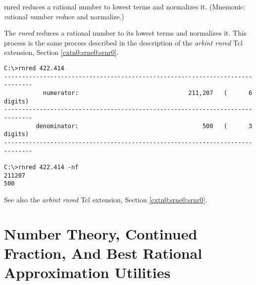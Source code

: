 \begin{dosutilcommandname}{rnred}%
reduces a rational number to lowest terms and normalizes it.
(Mnemonic:  \emph{r}ational
\emph{n}umber \emph{red}uce and normalize.)
\end{dosutilcommandname}

\begin{dosutilcommandsynopsis}
\end{dosutilcommandsynopsis}

\begin{dosutilcommanddescription}
The \emph{rnred} reduces a rational number to its lowest terms
and normalizes it.  This process is the same process
described in the description of the \emph{arbint rnred} Tcl
extension, Section \ref{cxtn0:srne0:srnr0}.
\end{dosutilcommanddescription}

\begin{dosutilcommandsampleinvocations}
\begin{scriptsize}
\begin{verbatim}
C:\>rnred 422.414
------------------------------------------------------------------------------
           numerator:                               211,207   (      6 digits)
------------------------------------------------------------------------------
         denominator:                                   500   (      3 digits)
------------------------------------------------------------------------------

C:\>rnred 422.414 -nf
211207
500
\end{verbatim}
\end{scriptsize}
\end{dosutilcommandsampleinvocations}

\begin{dosutilcommandseealso}
See also the \emph{arbint rnred} Tcl extension, 
Section \ref{cxtn0:srne0:srnr0}.
\end{dosutilcommandseealso}


\section[Number Theory, CF, And Approximation Utilities]
        {Number Theory, Continued Fraction, And Best Rational Approximation
         Utilities}
\label{cdcm0:snth0}


